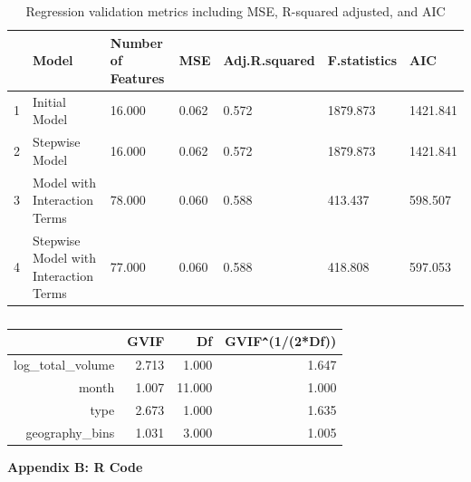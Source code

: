 \documentclass[11pt]{article}\usepackage[]{graphicx}\usepackage[]{color}
\begin{document}
\begin{center}
\begin{table}[ht]
\centering
\begin{tabular}{rp{1.5in}p{.8in}llll}
  \hline
 & Model & Number of Features & MSE & Adj.R.squared & F.statistics & AIC \\ 
  \hline
1 & Initial Model & 16.000 & 0.062 & 0.572 & 1879.873 & 1421.841 \\ 
  2 & Stepwise Model & 16.000 & 0.062 & 0.572 & 1879.873 & 1421.841 \\ 
  3 & Model with Interaction Terms & 78.000 & 0.060 & 0.588 & 413.437 & 598.507 \\ 
  4 & Stepwise Model with Interaction Terms & 77.000 & 0.060 & 0.588 & 418.808 & 597.053 \\ 
   \hline
\end{tabular}
\caption{Regression validation metrics including MSE, R-squared adjusted, and AIC} 
\label{reg_vali_metric}
\end{table}

\end{center} 


\begin{center}
\begin{table}[ht]
\centering
\begin{tabular}{rrrr}
  \hline
 & GVIF & Df & GVIF\verb|^|(1/(2*Df)) \\ 
  \hline
log\_total\_volume & 2.713 & 1.000 & 1.647 \\ 
  month & 1.007 & 11.000 & 1.000 \\ 
  type & 2.673 & 1.000 & 1.635 \\ 
  geography\_bins & 1.031 & 3.000 & 1.005 \\ 
   \hline
\end{tabular}
\caption{} 
\label{vif_table}
\end{table}

\end{center} 

\clearpage
\newpage
\noindent \Large{{\bf Appendix B: R Code}}

\end{document}
